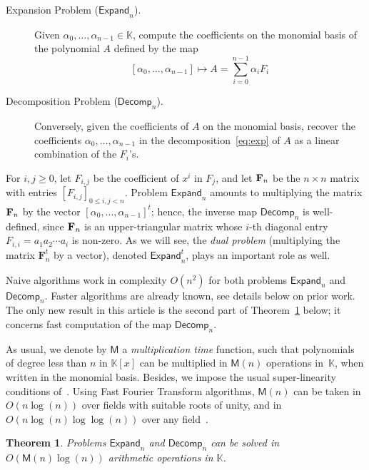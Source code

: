\documentclass{elsart}
\def\K {\ensuremath{\mathbb{K}}}
\def\M {\ensuremath{\mathsf{M}}}
\def\E{\textsf{Expand}}
\def\D{\textsf{Decomp}}
\newtheorem{Theorem}{Theorem}
\begin{document}
\medskip
\begin{description}
\item[Expansion Problem ($\E_n$).] Given $\alpha_0,\dots,\alpha_{n-1}
\in \K$, compute the coefficients on the monomial basis of the
polynomial $A$ defined by the map
\begin{equation}\label{eq:exp}
	[\alpha_0,\dots,\alpha_{n-1}] \mapsto A=\sum_{i=0}^{n-1} \alpha_i
F_i\end{equation} 
\item[Decomposition Problem ($\D_n$).] Conversely, given the
coefficients of $A$ on the monomial basis, recover the coefficients
$\alpha_0,\dots,\alpha_{n-1}$ in the decomposition~\eqref{eq:exp} of
$A$ as a linear combination of the $F_i$'s.
\end{description}

\medskip
For $i,j \ge 0$, let $F_{i,j}$ be the coefficient of $x^i$ in $F_j$,
and let ${\bf F}_n$ be the $n\times n$ matrix with entries
$[F_{i,j}]_{0 \le i,j < n}$. Problem $\E_n$ amounts to multiplying the
matrix ${\bf F}_n$ by the vector $[\alpha_0,\dots,\alpha_{n-1}]^t$;
hence, the inverse map $\D_n$ is well-defined, since ${\bf F}_n$ is an
upper-triangular matrix whose $i$-th diagonal entry $F_{i,i} = a_1 a_2
\cdots a_i$ is non-zero. As we will see, the {\it dual problem}
(multiplying the matrix $\mathbf{F}_n^t$ by a vector), denoted
$\E_n^t$, plays an important role as well.

Naive algorithms work in complexity $O(n^2)$ for both problems $\E_n$
and $\D_n$. Faster algorithms are already known, see details below on
prior work. The only new result in this article is the second part of
Theorem~\ref{Theo:1} below; it concerns fast computation of the map $\D_n$. 

As usual, we denote by $\M$ a \emph{multiplication time} function,
such that polynomials of degree less than $n$ in $\K[x]$ can be
multiplied in $\M(n)$ operations in~$\K$, when written in the monomial
basis. Besides, we impose the usual super-linearity conditions
of~\cite[Chap.~8]{GaGe99}.  Using Fast Fourier Transform algorithms,
$\M(n)$ can be taken in $O(n \log(n))$ over fields with suitable roots
of unity, and in $O(n \log(n)\log\log(n))$ over any
field~\cite{ScSt71,CaKa91}.

\begin{Theorem}\label{Theo:1}
  Problems \emph{$\E_n$} and \emph{$\D_n$} can be solved in
  $O(\M(n)\log(n))$ arithmetic operations in $\K$.
\end{Theorem}
\end{document}
